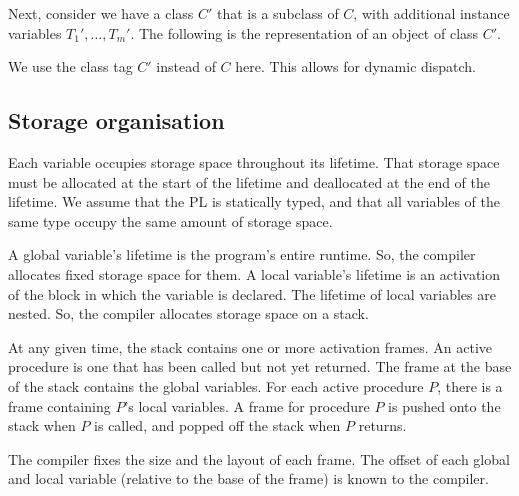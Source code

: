 \documentclass[a4paper, openany]{memoir}
\begin{document}
Next, consider we have a class $C'$ that is a subclass of $C$, with additional instance variables $T_1', \dots, T_m'$. The following is the representation of an object of class $C'$.
\begin{figure}[H]
    \centering
\end{figure}
\noindent We use the class tag $C'$ instead of $C$ here. This allows for dynamic dispatch.

\subsection{Storage organisation}
Each variable occupies storage space throughout its lifetime. That storage space must be allocated at the start of the lifetime and deallocated at the end of the lifetime. We assume that the PL is statically typed, and that all variables of the same type occupy the same amount of storage space.

A global variable's lifetime is the program's entire runtime. So, the compiler allocates fixed storage space for them. A local variable's lifetime is an activation of the block in which the variable is declared. The lifetime of local variables are nested. So, the compiler allocates storage space on a stack.

At any given time, the stack contains one or more activation frames. An active procedure is one that has been called but not yet returned. The frame at the base of the stack contains the global variables. For each active procedure $P$, there is a frame containing $P$'s local variables. A frame for procedure $P$ is pushed onto the stack when $P$ is called, and popped off the stack when $P$ returns.

The compiler fixes the size and the layout of each frame. The offset of each global and local variable (relative to the base of the frame) is known to the compiler.
\end{document}
